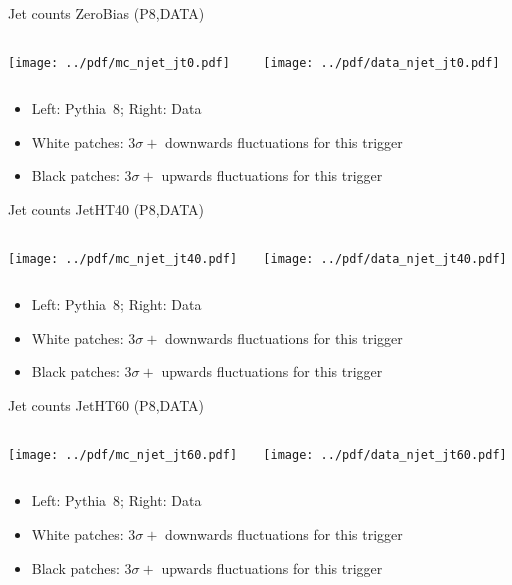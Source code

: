 \documentclass[9pt]{beamer}
\begin{document}
\begin{frame}[t]{Jet counts ZeroBias (P8,DATA)}
\begin{columns}[T]
  \begin{column}{.5\textwidth}
  \texttt{[image: ../pdf/mc\_njet\_jt0.pdf]}
  \end{column}
  \begin{column}{.5\textwidth}
  \texttt{[image: ../pdf/data\_njet\_jt0.pdf]}
  \end{column}
\end{columns}
\begin{itemize}
 \item Left: Pythia~8; Right: Data
 \item White patches: $3\sigma+$ downwards fluctuations for this trigger
 \item Black patches: $3\sigma+$ upwards fluctuations for this trigger
\end{itemize}
\end{frame}

\begin{frame}[t]{Jet counts JetHT40 (P8,DATA)}
\begin{columns}[T]
  \begin{column}{.5\textwidth}
  \texttt{[image: ../pdf/mc\_njet\_jt40.pdf]}
  \end{column}
  \begin{column}{.5\textwidth}
  \texttt{[image: ../pdf/data\_njet\_jt40.pdf]}
  \end{column}
\end{columns}
\begin{itemize}
 \item Left: Pythia~8; Right: Data
 \item White patches: $3\sigma+$ downwards fluctuations for this trigger
 \item Black patches: $3\sigma+$ upwards fluctuations for this trigger
\end{itemize}
\end{frame}

\begin{frame}[t]{Jet counts JetHT60 (P8,DATA)}
\begin{columns}[T]
  \begin{column}{.5\textwidth}
  \texttt{[image: ../pdf/mc\_njet\_jt60.pdf]}
  \end{column}
  \begin{column}{.5\textwidth}
  \texttt{[image: ../pdf/data\_njet\_jt60.pdf]}
  \end{column}
\end{columns}
\begin{itemize}
 \item Left: Pythia~8; Right: Data
 \item White patches: $3\sigma+$ downwards fluctuations for this trigger
 \item Black patches: $3\sigma+$ upwards fluctuations for this trigger
\end{itemize}
\end{frame}
\end{document}
